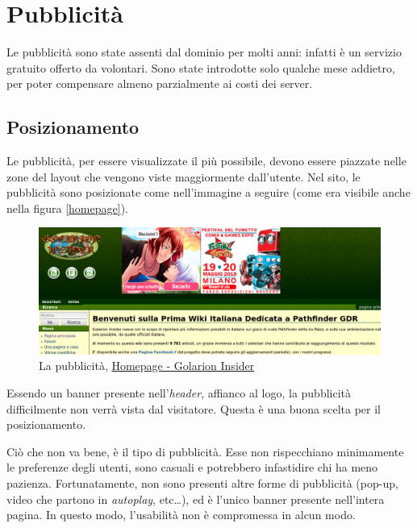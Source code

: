 \section{Pubblicità}

Le pubblicità sono state assenti dal dominio per molti anni: infatti è un servizio gratuito
offerto da volontari. Sono state introdotte solo qualche mese addietro, per poter compensare
almeno parzialmente ai costi dei server.

\subsection{Posizionamento}
Le pubblicità, per essere visualizzate il più possibile, devono essere piazzate nelle zone del
layout che vengono viste maggiormente dall'utente. Nel sito, le pubblicità sono posizionate
come nell'immagine a seguire (come era visibile anche nella figura \ref{homepage}).

\begin{figure}[hbt]
    \includegraphics[width=\textwidth]{img/pubblicita.png}
    \caption{La pubblicità, \href{http://golarion.altervista.org/wiki/Pagina_principale}{Homepage - Golarion Insider}}
\end{figure}

Essendo un banner presente nell'\emph{header}, affianco al logo, la pubblicità difficilmente non verrà vista 
dal visitatore. Questa è una buona scelta per il posizionamento.\par
Ciò che non va bene, è il tipo di pubblicità. Esse non rispecchiano minimamente le preferenze degli utenti, 
sono casuali e potrebbero infastidire chi ha meno pazienza.
Fortunatamente, non sono presenti altre forme di pubblicità (pop-up, video che partono in \emph{autoplay}, etc\dots),
ed è l'unico banner presente nell'intera pagina. In questo modo, l'usabilità non è compromessa in alcun modo.
